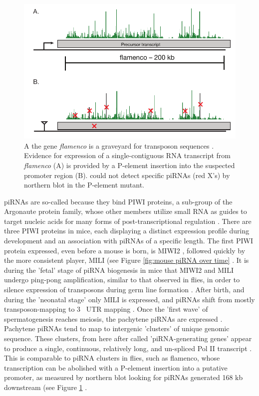 \begin{figure}[htbp]
	\centering 
	\includegraphics{Figures/Chapter1/FlamencoLocus.pdf}
	\caption[Genetic evidence for long, continuous fly piRNA precursor transcripts]
	{
		A the \flies{} gene \textit{flamenco} is a graveyard for transposon sequences \citep{Pelisson1994}. Evidence for expression of a single-contiguous RNA transcript from \textit{flamenco} (A) is provided by a P-element insertion into the suspected promoter region (B). \citep{Brennecke2007} could not detect specific piRNAs (red X's) by northern blot in the P-element mutant.
	}
	\label{fig:flamenco}
\end{figure}


piRNAs are so-called because they bind PIWI proteins, a sub-group of the Argonaute protein family, whose other members utilize small RNA as guides to target nucleic acids for many forms of post-transcriptional regulation \citep{Siomi2011}. There are three PIWI proteins in mice, each displaying a distinct expression profile during development and an association with piRNAs of a specific length. The first PIWI protein expressed, even before a mouse is born, is MIWI2 \citep{Carmell2007}, followed quickly by the more consistent player, MILI (see Figure \ref{fig:mouse piRNA over time} \citep{Kuramochi-Miyagawa2004, Aravin2006}. It is during the 'fetal' stage of piRNA biogenesis in mice that MIWI2 and MILI undergo ping-pong amplification, similar to that observed in flies, in order to silence expression of transposons during germ line formation \citep{Brennecke2007, Kuramochi-Miyagawa2008}. After birth, and during the 'neonatal stage' only MILI is expressed, and piRNAs shift from mostly transposon-mapping to 3\textprime~ UTR mapping \citep{Robine2009}. Once the 'first wave' of spermatogenesis \citep{Oakberg1956b, Laiho2013a} reaches meiosis, the pachytene piRNAs are expressed \citep{Girard2006, Lau2006, Li2013h}. Pachytene piRNAs tend to map to intergenic 'clusters' of unique genomic sequence. These clusters, from here after called 'piRNA-generating genes' appear to produce a single, continuous, relatively long, and un-spliced Pol II transcript \citep{Li2013h}. This is comparable to piRNA clusters in flies, such as flamenco, whose transcription can be abolished with a P-element insertion into a putative promoter, as measured by northern blot looking for piRNAs generated 168 kb downstream (see Figure \ref{fig:flamenco} \citep{Brennecke2007}. 
 
